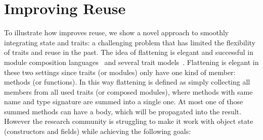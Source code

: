 \saveSpace\saveSpace\section{Improving Reuse}\saveSpace




To illustrate how \name improves reuse,
we show a novel approach
to smoothly integrating state and traits: a challenging problem that has limited the flexibility of traits and
reuse in the past.
The idea of flattening is elegant and successful in module
composition languages~\cite{ancona2002calculus} and several trait
models~\cite{ducasse2006traits,Bergel2007,BETTINI2013521,fjig}. 
Flattening is elegant in these two settings
since traits (or modules) only have one kind of member: methods (or functions). In this way 
flattening is defined as simply collecting 
all members from all used traits (or composed modules), where methods with same name and type signature are summed into a single one.
At most one of those summed methods can have a body, which will be propagated into the result.
 However the research
community is struggling to make it work with object state (constructors
and fields) while achieving the following goals:

